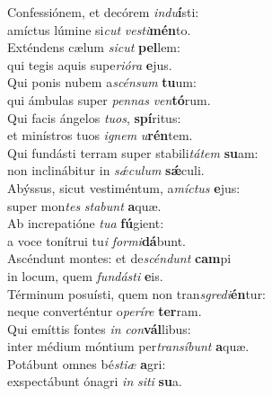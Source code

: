 \evenverse Confessiónem, et decórem \textit{in}\textit{du}\textbf{í}sti:~\*\\
\evenverse amíctus lúmine si\textit{cut} \textit{ve}\textit{sti}\textbf{mén}to.\\
\oddverse Exténdens cælum \textit{si}\textit{cut} \textbf{pel}lem:~\*\\
\oddverse qui tegis aquis supe\textit{ri}\textit{ó}\textit{ra} \textbf{e}jus.\\
\evenverse Qui ponis nubem a\textit{scén}\textit{sum} \textbf{tu}um:~\*\\
\evenverse qui ámbulas super \textit{pen}\textit{nas} \textit{ven}\textbf{tó}rum.\\
\oddverse Qui facis ángelos \textit{tu}\textit{os}, \textbf{spí}ritus:~\*\\
\oddverse et minístros tuos \textit{i}\textit{gnem} \textit{u}\textbf{rén}tem.\\
\evenverse Qui fundásti terram super stabili\textit{tá}\textit{tem} \textbf{su}am:~\*\\
\evenverse non inclinábitur in \textit{sǽ}\textit{cu}\textit{lum} \textbf{sǽ}culi.\\
\oddverse Abýssus, sicut vestiméntum, a\textit{mí}\textit{ctus} \textbf{e}jus:~\*\\
\oddverse super mon\textit{tes} \textit{sta}\textit{bunt} \textbf{a}quæ.\\
\evenverse Ab increpatióne \textit{tu}\textit{a} \textbf{fú}gient:~\*\\
\evenverse a voce tonítrui tu\textit{i} \textit{for}\textit{mi}\textbf{dá}bunt.\\
\oddverse Ascéndunt montes: et de\textit{scén}\textit{dunt} \textbf{cam}pi~\*\\
\oddverse in locum, quem \textit{fun}\textit{dá}\textit{sti} \textbf{e}is.\\
\evenverse Términum posuísti, quem non tran\textit{sgre}\textit{di}\textbf{én}tur:~\*\\
\evenverse neque converténtur o\textit{pe}\textit{rí}\textit{re} \textbf{ter}ram.\\
\oddverse Qui emíttis fontes \textit{in} \textit{con}\textbf{vál}libus:~\*\\
\oddverse inter médium móntium per\textit{tran}\textit{sí}\textit{bunt} \textbf{a}quæ.\\
\evenverse Potábunt omnes bé\textit{sti}\textit{æ} \textbf{a}gri:~\*\\
\evenverse exspectábunt ónagri \textit{in} \textit{si}\textit{ti} \textbf{su}a.\\
